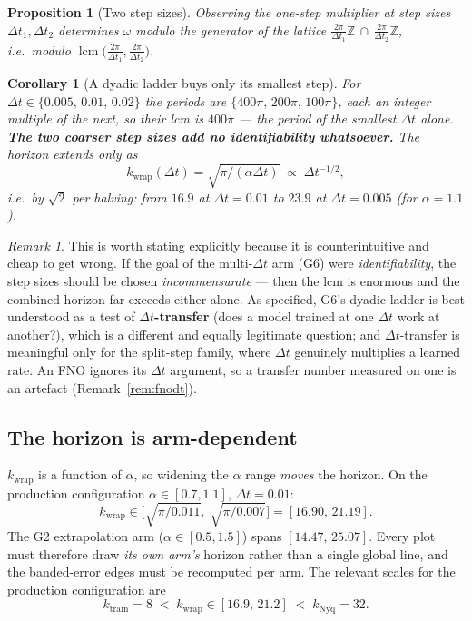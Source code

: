 \documentclass[11pt,a4paper]{article}
\theoremstyle{plain}
\newtheorem{proposition}[theorem]{Proposition}
\newtheorem{corollary}[theorem]{Corollary}
\theoremstyle{definition}
\theoremstyle{remark}
\newtheorem{remark}[theorem]{Remark}
\newcommand{\Z}{\mathbb{Z}}
\newcommand{\dt}{\Delta t}
\newcommand{\kwrap}{k_{\mathrm{wrap}}}
\newcommand{\ktrain}{k_{\mathrm{train}}}
\newcommand{\knyq}{k_{\mathrm{Nyq}}}
\begin{document}
\begin{proposition}[Two step sizes]
\label{prop:multidt}
Observing the one-step multiplier at step sizes $\dt_1,\dt_2$ determines $\omega$ modulo
the generator of the lattice $\tfrac{2\pi}{\dt_1}\Z \,\cap\, \tfrac{2\pi}{\dt_2}\Z$,
i.e.\ modulo $\operatorname{lcm}\!\bigl(\tfrac{2\pi}{\dt_1},\tfrac{2\pi}{\dt_2}\bigr)$.
\end{proposition}

\begin{corollary}[A dyadic ladder buys only its smallest step]
\label{cor:dyadic}
For $\dt \in\{0.005,\,0.01,\,0.02\}$ the periods are $\{400\pi,\,200\pi,\,100\pi\}$, each
an integer multiple of the next, so their lcm is $400\pi$ --- the period of the smallest
$\dt$ alone. \textbf{The two coarser step sizes add no identifiability whatsoever.} The
horizon extends only as
\[
\kwrap(\dt) = \sqrt{\pi/(\alpha\dt)} \;\propto\; \dt^{-1/2},
\]
i.e.\ by $\sqrt2$ per halving: from $16.9$ at $\dt=0.01$ to $23.9$ at $\dt=0.005$
(for $\alpha=1.1$).
\end{corollary}

\begin{remark}
This is worth stating explicitly because it is counterintuitive and cheap to get wrong.
If the goal of the multi-$\dt$ arm (G6) were \emph{identifiability}, the step sizes should
be chosen \emph{incommensurate} --- then the lcm is enormous and the combined horizon far
exceeds either alone. As specified, G6's dyadic ladder is best understood as a test of
\textbf{$\dt$-transfer} (does a model trained at one $\dt$ work at another?), which is a
different and equally legitimate question; and $\dt$-transfer is meaningful only for the
split-step family, where $\dt$ genuinely multiplies a learned rate. An FNO ignores its
$\dt$ argument, so a transfer number measured on one is an artefact
(Remark~\ref{rem:fnodt}).
\end{remark}

\subsection{The horizon is arm-dependent}

$\kwrap$ is a function of $\alpha$, so widening the $\alpha$ range \emph{moves} the
horizon. On the production configuration $\alpha\in[0.7,1.1]$, $\dt=0.01$:
\[
\kwrap \in\bigl[\sqrt{\pi/0.011},\;\sqrt{\pi/0.007}\bigr] = [16.90,\,21.19].
\]
The G2 extrapolation arm ($\alpha\in[0.5,1.5]$) spans $[14.47,\,25.07]$. Every plot must
therefore draw \emph{its own arm's} horizon rather than a single global line, and the
banded-error edges must be recomputed per arm. The relevant scales for the production
configuration are
\[
\ktrain = 8 \;<\; \kwrap \in[16.9,\,21.2] \;<\; \knyq = 32 .
\]
\end{document}
